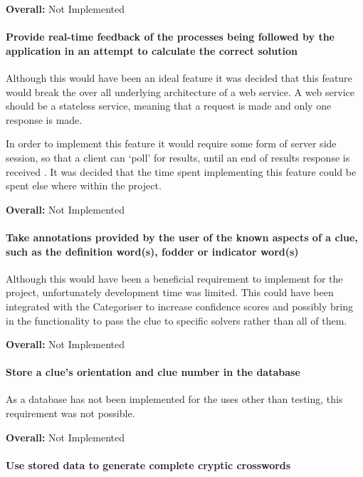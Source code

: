 {\bf Overall:} Not Implemented


\paragraph{Provide real-time feedback of the processes being followed by the
application in an attempt to calculate the correct solution}

Although this would have been an ideal feature it was decided that this feature
would break the over all underlying architecture of a web service. A web service
should be a stateless service, meaning that a request is made and only one 
response is made.

In order to implement this feature it would require some form of server side 
session, so that a client can `poll' for results, until an end of results 
response is received . It was decided that the time spent implementing this 
feature could be spent else where within the project.

{\bf Overall:} Not Implemented


\paragraph{Take annotations provided by the user of the known aspects of a clue,
such as the definition word(s), fodder or indicator word(s)}

Although this would have been a beneficial requirement to implement for the
project, unfortunately development time was limited. This could have been
integrated with the Categoriser to increase confidence scores and possibly
bring in the functionality to pass the clue to specific solvers rather than all
of them.

{\bf Overall:} Not Implemented


\paragraph{Store a clue's orientation and clue number in the database}

As a database has not been implemented for the uses other than testing, this
requirement was not possible.

{\bf Overall:} Not Implemented


\paragraph{Use stored data to generate complete cryptic crosswords}

